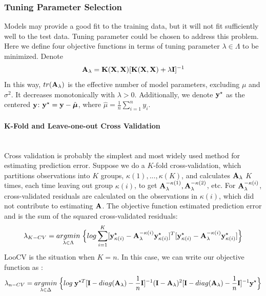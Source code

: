 \documentclass[11pt]{article}
\begin{document}
\subsubsection{{Tuning Parameter Selection}}
Models may provide a good fit to the training data, but it will not fit sufficiently well to the test data. Tuning parameter could be chosen to address this problem. Here we define four objective functions in terms of tuning parameter $\lambda \in \Lambda$ to be minimized. Denote
\begin{align}
{\bf A}_\lambda={\bf K}({\bf X}, {\bf X})[{\bf K}({\bf X}, {\bf X})+\lambda {\bf I}]^{-1}
\end{align}
In this way, $tr({\bf A}_\lambda)$ is the effective number of model parameters, excluding $\mu$ and $\sigma^2$. It decreases monotonically with $\lambda>0$. Additionally, we denote ${\bf y}^\star$ as the centered ${\bf y}$: ${\bf y}^\star={\bf y}-\hat{\boldsymbol{\mu}}$, where $\hat{\mu}=\frac{1}{n}\sum_{i=1}^ny_i$.

\paragraph{K-Fold and Leave-one-out Cross Validation}\mbox{}\\
Cross validation is probably the simplest and most widely used method for estimating prediction error. Suppose we do a $K$-fold cross-validation, which partitions observations into $K$ groups, $\kappa(1),...,\kappa(K)$, and calculates ${\bf A}_\lambda$ $K$ times, each time leaving out group $\kappa(i)$, to get ${\bf A}_\lambda^{-\kappa(1)}, {\bf A}_\lambda^{-\kappa(2)}$, etc. For ${\bf A}_\lambda^{-\kappa(i)}$, cross-validated residuals are calculated on the observations in $\kappa(i)$, which did not contribute to estimating ${\bf A}$. The objective function estimated prediction error and is the sum of the squared cross-validated residuals:
\begin{align}
\lambda_{K-CV}=\underset{\lambda \in \Lambda}{argmin}\;\Big\{log\sum_{i=1}^K[{\bf y}_{\kappa(i)}^\star-{\bf A}_\lambda^{-\kappa(i)}{\bf y}_{\kappa(i)}^\star]^T[{\bf y}_{\kappa(i)}^\star-{\bf A}_\lambda^{-\kappa(i)}{\bf y}_{\kappa(i)}^\star]\Big\}
\end{align}
LooCV is the situation when $K=n$. In this case, we can write our objective function as \citep{golub_generalized_1979}:
\begin{align}
\lambda_{n-CV}=\underset{\lambda \in \Delta}{argmin}\;\Big\{log\;{\bf y}^{\star T}[{\bf I}-diag({\bf A}_\lambda)-\frac{1}{n}{\bf I}]^{-1}({\bf I}-{\bf A}_\lambda)^2[{\bf I}-diag({\bf A}_\lambda)-\frac{1}{n}{\bf I}]^{-1}{\bf y}^\star \Big\} \label{3}
\end{align}
\end{document}

